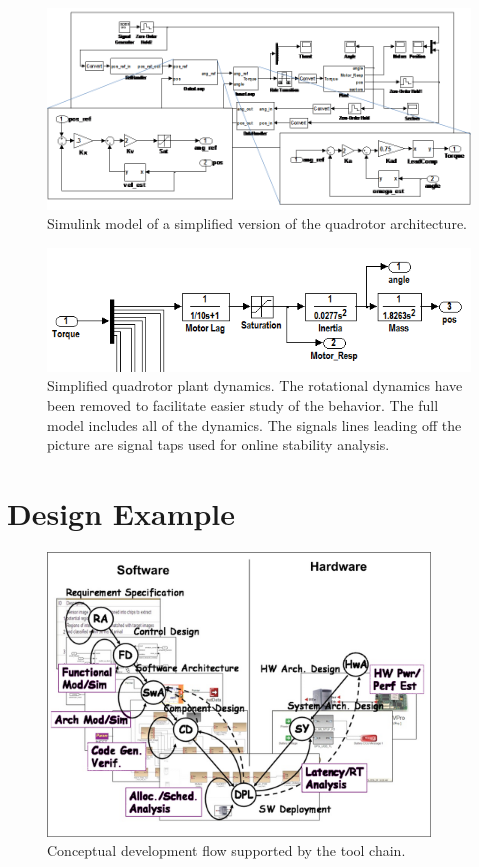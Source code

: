 \begin{figure}
\centering
\includegraphics[width=0.9\columnwidth]{figures/quadrotor_mdl.png}
    \caption{Simulink model of a simplified version of the quadrotor architecture.}
    \label{fig:qr_mdl}
\end{figure}

\begin{figure}
\centering
\includegraphics[width=0.5\columnwidth]{figures/quadrotor_plant.png}
    \caption{Simplified quadrotor plant dynamics.  The rotational dynamics have
been removed to facilitate easier study of the behavior.  The full model
includes all of the dynamics.  The signals lines leading off the picture are
signal taps used for online stability analysis.}
    \label{fig:qr_plant}
\end{figure}

\section{Design Example}

\begin{figure}
   \centering
   \includegraphics[width=4in]{figures/vdiagram.png}
   \caption{Conceptual development flow supported by the tool chain.}
   \label{fig:vdiagram}
\end{figure}

